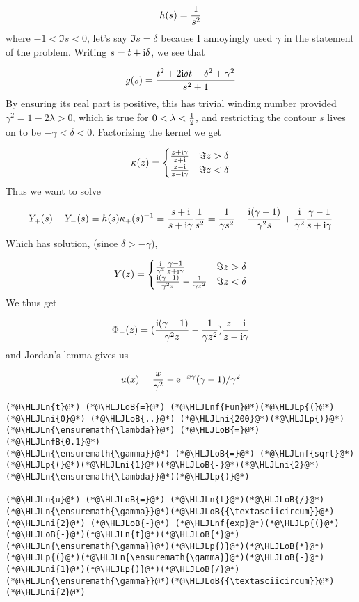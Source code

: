 \documentclass[12pt,landscape]{article}
\newcommand{\HLJLn}[1]{#1}
\newcommand{\HLJLnf}[1]{\textcolor[RGB]{66,102,213}{#1}}
\newcommand{\HLJLnfB}[1]{\textcolor[RGB]{59,151,46}{#1}}
\newcommand{\HLJLni}[1]{\textcolor[RGB]{59,151,46}{#1}}
\newcommand{\HLJLoB}[1]{\textcolor[RGB]{102,102,102}{\textbf{#1}}}
\newcommand{\HLJLp}[1]{#1}
\def\I{ {\rm i} }
\def\E{ {\rm e} }
\begin{document}
{\[
h(s) = {1 \over s^2}
\]
where $-1 < \Im s  < 0$, let's say $\Im s  = \delta$ because I annoyingly used $\gamma$ in the statement of the problem. Writing $s = t + \I \delta$, we see that

\[
g(s) =  {t^2 +2 \I \delta t -\delta^2 +\gamma^2 \over s^2 + 1}
\]
By ensuring its real part is positive, this has trivial winding number provided $\gamma^2 = 1 - 2\lambda > 0$, which is true for $0 < \lambda < {1 \over 2}$, and restricting the contour $s$ lives on to be $- {\gamma} < \delta < 0$. Factorizing the kernel we get

\[
\kappa(z) = \begin{cases}
    {z+\I  \gamma \over z + \I} & \Im z > \delta\\
    {z-\I  \over z-\I  \gamma} & \Im z < \delta
    \end{cases}
\]
Thus we want to solve

\[
Y_+(s) - Y_-(s) = h(s) \kappa_+(s)^{-1} = {s + \I \over s + \I  \gamma} { 1 \over s^2} = {1 \over \gamma s^2} - {\I ( \gamma - 1) \over \gamma^2 s} + {\I \over \gamma^2 }{  \gamma - 1 \over s+ \I  \gamma}
\]
Which has solution, (since $\delta > - \gamma$),

\[
Y(z) = \begin{cases}
   {\I \over \gamma^2 }{  \gamma - 1 \over z+ \I \gamma} & \Im z > \delta\\
 {\I ( \gamma - 1) \over \gamma^2 z} - {1 \over \gamma z^2} & \Im z < \delta
    \end{cases}
\]
We thus get

\[
\Phi_-(z) = ({\I ( \gamma - 1) \over \gamma^2 z} - {1 \over \gamma z^2})     {z-\I  \over z-\I  \gamma}
\]
and Jordan's lemma gives us

\[
u(x) = {x \over \gamma^2} - \E^{-x \gamma}(\gamma-1)/\gamma^2
\]

\begin{lstlisting}
(*@\HLJLn{t}@*) (*@\HLJLoB{=}@*) (*@\HLJLnf{Fun}@*)(*@\HLJLp{(}@*)(*@\HLJLni{0}@*) (*@\HLJLoB{..}@*) (*@\HLJLni{200}@*)(*@\HLJLp{)}@*)
(*@\HLJLn{\ensuremath{\lambda}}@*) (*@\HLJLoB{=}@*) (*@\HLJLnfB{0.1}@*)
(*@\HLJLn{\ensuremath{\gamma}}@*) (*@\HLJLoB{=}@*) (*@\HLJLnf{sqrt}@*)(*@\HLJLp{(}@*)(*@\HLJLni{1}@*)(*@\HLJLoB{-}@*)(*@\HLJLni{2}@*)(*@\HLJLn{\ensuremath{\lambda}}@*)(*@\HLJLp{)}@*)

(*@\HLJLn{u}@*) (*@\HLJLoB{=}@*) (*@\HLJLn{t}@*)(*@\HLJLoB{/}@*)(*@\HLJLn{\ensuremath{\gamma}}@*)(*@\HLJLoB{{\textasciicircum}}@*)(*@\HLJLni{2}@*) (*@\HLJLoB{-}@*) (*@\HLJLnf{exp}@*)(*@\HLJLp{(}@*)(*@\HLJLoB{-}@*)(*@\HLJLn{t}@*)(*@\HLJLoB{*}@*)(*@\HLJLn{\ensuremath{\gamma}}@*)(*@\HLJLp{)}@*)(*@\HLJLoB{*}@*)(*@\HLJLp{(}@*)(*@\HLJLn{\ensuremath{\gamma}}@*)(*@\HLJLoB{-}@*)(*@\HLJLni{1}@*)(*@\HLJLp{)}@*)(*@\HLJLoB{/}@*)(*@\HLJLn{\ensuremath{\gamma}}@*)(*@\HLJLoB{{\textasciicircum}}@*)(*@\HLJLni{2}@*)


\end{lstlisting}}
\end{document}

